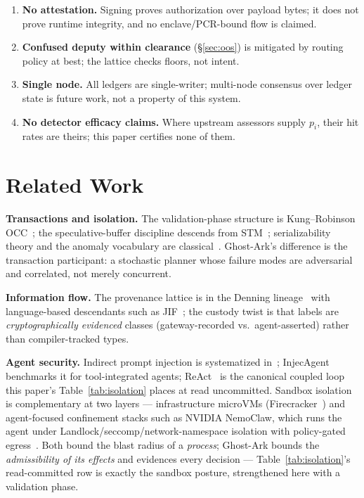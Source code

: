 \documentclass[10pt,twocolumn,letterpaper]{article}
\newcommand{\ghostark}{Ghost-Ark}
\begin{document}
\begin{enumerate}
measurement appears in this paper.
\item \textbf{No attestation.} Signing proves authorization over payload
bytes; it does not prove runtime integrity, and no enclave/PCR-bound flow is
claimed.
\item \textbf{Confused deputy within clearance} (\S\ref{sec:oos}) is
mitigated by routing policy at best; the lattice checks floors, not intent.
\item \textbf{Single node.} All ledgers are single-writer; multi-node
consensus over ledger state is future work, not a property of this system.
\item \textbf{No detector efficacy claims.} Where upstream assessors supply
$p_i$, their hit rates are theirs; this paper certifies none of them.
\end{enumerate}

\section{Related Work}
\label{sec:related}

\textbf{Transactions and isolation.} The validation-phase structure is
Kung--Robinson OCC~\cite{kung1981occ}; the speculative-buffer discipline
descends from STM~\cite{shavit1995stm,herlihy1993tm}; serializability theory
and the anomaly vocabulary are classical~\cite{papadimitriou1979serial,
berenson1995critique,bernstein1981concurrency}. \ghostark{}'s difference is
the transaction participant: a stochastic planner whose failure modes are
adversarial and correlated, not merely concurrent.

\textbf{Information flow.} The provenance lattice is in the Denning
lineage~\cite{denning1976lattice} with language-based descendants such as
JIF~\cite{myers1997jflow}; the custody twist is that labels are
\emph{cryptographically evidenced} classes (gateway-recorded vs.\
agent-asserted) rather than compiler-tracked types.

\textbf{Agent security.} Indirect prompt injection is systematized
in~\cite{greshake2023not}; InjecAgent~\cite{zhan2024injecagent} benchmarks
it for tool-integrated agents; ReAct~\cite{yao2023react} is the canonical
coupled loop this paper's Table~\ref{tab:isolation} places at read
uncommitted. Sandbox isolation is complementary at two layers ---
infrastructure microVMs (Firecracker~\cite{agache2020firecracker}) and
agent-focused confinement stacks such as NVIDIA NemoClaw, which runs the
agent under Landlock/seccomp/network-namespace isolation with policy-gated
egress~\cite{nemoclaw2026}. Both bound the blast radius of a \emph{process};
\ghostark{} bounds the \emph{admissibility of its effects} and evidences
every decision --- Table~\ref{tab:isolation}'s read-committed row is exactly
the sandbox posture, strengthened here with a validation phase.
\end{document}
